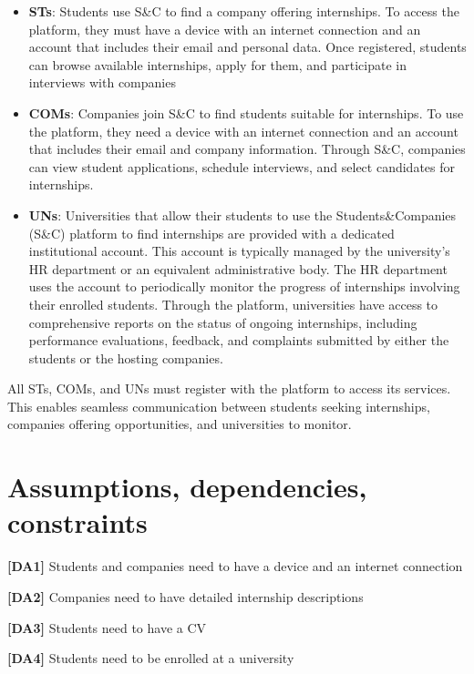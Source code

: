 \begin{itemize}
    \item \textbf{STs}: Students use S\&C to find a company offering internships. To access the platform, they must have a device with an internet connection and an account that includes their email and personal data. Once registered, students can browse available internships, apply for them, and participate in interviews with 
    companies

    \item \textbf{COMs}:  Companies join S\&C to find students suitable for internships. To use the platform, they need a device with an internet connection and an account that includes their email and company information. Through S\&C, companies can view student applications, schedule interviews, and select candidates for internships.

    \item \textbf{UNs}: Universities that allow their students to use the Students\&Companies (S\&C) platform to find internships are provided with a dedicated institutional account. This account is typically managed by the university’s HR department or an equivalent administrative body.
    The HR department uses the account to periodically monitor the progress of internships involving their enrolled students. Through the platform, universities have access to comprehensive reports on the status of ongoing internships, including performance evaluations, feedback, and complaints submitted by either the students or the hosting companies.
    
\end{itemize}

All STs, COMs, and UNs must register with the platform to access its services. This enables seamless communication between students seeking internships, companies offering opportunities, and universities to monitor.

\pagebreak
\section{Assumptions, dependencies, constraints}
\textbf{[DA1] }Students and companies need to have a device and an internet connection 

\textbf{[DA2]} Companies need to have detailed internship descriptions

\textbf{[DA3]} Students need to have a CV

\textbf{[DA4]} Students need to be enrolled at a university 

